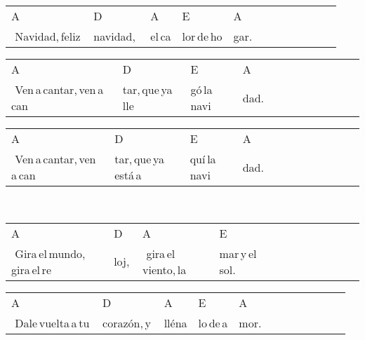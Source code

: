 \begin{multicols}{2}
\begin{minipage}{\columnwidth}
\noindent
\begin{tabular}{llllllllllll}
A&D&A&E&A\\
\,\,Navidad,\,feliz\,&navidad,\,\,&el\,ca&lor\,de\,ho&gar.
\end{tabular}

\noindent
\begin{tabular}{llllllllllll}
A&D&E&A\\
\,\,Ven\,a\,cantar,\,ven\,a\,can&tar,\,que\,ya\,lle&gó\,la\,navi&dad.
\end{tabular}

\noindent
\begin{tabular}{llllllllllll}
A&D&E&A\\
\,\,Ven\,a\,cantar,\,ven\,a\,can&tar,\,que\,ya\,está\,a&quí\,la\,navi&dad.
\end{tabular}
\end{minipage}\\

\noindent
\begin{minipage}{\columnwidth}
\noindent
\noindent
\begin{tabular}{llllllllllll}
A&D&A&E\\
\,\,Gira\,el\,mundo,\,gira\,el\,re&loj,\,&\,\,gira\,el\,viento,\,la\,&mar\,y\,el\,sol.
\end{tabular}

\noindent
\begin{tabular}{llllllllllll}
A&D&A&E&A\\
\,\,Dale\,vuelta\,a\,tu\,&corazón,\,y\,&lléna&lo\,de\,a&mor.
\end{tabular}
\end{minipage}\\


\chorus{}

\end{multicols}